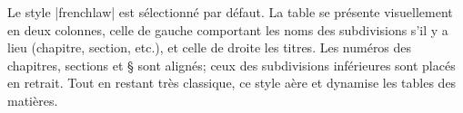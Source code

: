 \begin{noprint}
\end{noprint}

Le style |frenchlaw| est sélectionné par défaut. La table se présente visuellement en deux colonnes, celle de gauche comportant les noms des subdivisions s'il y a lieu (chapitre, section, etc.), et celle de droite les titres. Les numéros des chapitres, sections et § sont alignés; ceux des subdivisions inférieures sont placés en retrait. Tout en restant très classique, ce style aère et dynamise les tables des matières.

\begin{noprint}
\end{noprint}

